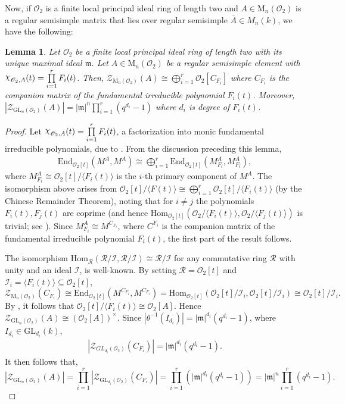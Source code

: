 \documentclass[11pt,twoside]{amsart}
\newcommand{\GL}{\mathrm{GL}}
\newcommand{\M}{\mathrm{M}}
\newcommand{\upchi}{\raisebox{0.4ex}{$\chi$}}
\newcommand{\Char}{\upchi}
\newcommand{\R}{\mathscr{O}_2}
\newcommand{\Zen}{\mathscr{Z}}
\newtheorem{lemma}{Lemma}[section]
\theoremstyle{definition} %
\begin{document}
Now, if $\R$ is a finite local principal ideal ring of length two and $A\in \M_n(\R)$ is a regular semisimple matrix that lies over regular semisimple $\overline{A} \in M_n(k)$, we have the following: 
\begin{lemma}\label{lem:centra-reg-sem-R}
Let $\R$ be a finite local principal ideal ring of length two with its unique maximal ideal $\mathfrak{m}$. Let $A\in \M_n(\R)$ be a regular semisimple element with $\Char_{\R, A}(t) =\prod\limits_{i=1}^rF_i(t)$. Then, $\Zen_{\M_n(\R)}(A)\cong \bigoplus\limits_{i=1}^r \R[C_{F_i}]$ where $C_{F_i}$ is the companion matrix of the fundamental irreducible polynomial $F_i(t)$. Moreover, $|\Zen_{\GL_n(\R)}(A)|=|\mathfrak{m}|^n\prod\limits_{i=1}^r(q^{d_i}-1)$ where $d_i$ is degree of $F_i(t)$.
\end{lemma}
\begin{proof} 
Let $\Char_{\R, A}(t) = \prod\limits_{i=1}^r F_i(t)$, a factorization into monic fundamental irreducible polynomials, due to . From the discussion preceding this lemma, 
\begin{align*}
\mathrm{End}_{\R[t]}(M^A,M^A)\cong \bigoplus\limits_{i=1}^r \mathrm{End}_{\R[t]}(M^A_{F_i},M^A_{F_i}),
\end{align*}
where $M^A_{F_i} \cong \R[t]/\langle F_i(t)\rangle$ is the $i$-th primary component of $M^A$. The isomorphism above arises from $\R[t]/\langle F(t)\rangle\cong \bigoplus\limits_{i=1}^r\R[t]/\langle F_i(t)\rangle$ (by the Chinese Remainder Theorem), noting that for $i\neq j$ the polynomials $F_i(t), F_j(t)$ are coprime (and hence $\mathrm{Hom}_{\R[t]}\left(\R/\langle F_i(t) \rangle, \R/\langle F_j(t) \rangle\right)$ is trivial; see ). Since $M^A_{F_i}\cong M^{C_{F_i}}$, where $C^{F_i}$ is the companion matrix of the fundamental irreducible polynomial $F_i(t)$, the first part of the result follows.

The isomorphism $\mathrm{Hom}_{\mathscr R}(\mathscr{R}/\mathscr{I},\mathscr R/\mathscr I)\cong \mathscr R/\mathscr I$ for any commutative ring $\mathscr R$ with unity and an ideal $\mathscr I$, is well-known. By setting $\mathscr R = \R[t]$ and $\mathscr I_i=\langle F_i(t)\rangle\subseteq \R[t]$, 
 $$\Zen_{\M_n(\R)}\left(C_{F_i}\right)\cong \mathrm{End}_{\R[t]}(M^{C_{F_i}},M^{C_{F_i}})
 =\mathrm{Hom}_{\R[t]}( \R[t]/\mathscr I_i, \R[t]/\mathscr I_i)\cong \R[t]/\mathscr I_i.$$
By , it follows that  
$\R[t]/\langle F_i(t)\rangle \cong \R[A].$
Hence $\Zen_{\GL_n(\R)}(A)\cong (\R[A])^{\times}$.
Since $|\theta^{-1}(I_{d_i}) | =|\mathfrak{m}|^{d_i}(q^{d_i}-1)$, where $I_{d_i}\in\GL_{d_i}(k)$,
\begin{align*}
|\Zen_{GL_{d_i}(\R)}(C_{F_i})|=|\mathfrak{m}|^{d_i}(q^{d_i}-1).    
\end{align*}
It then follows that,
$$ |\Zen_{\GL_n(\R)}(A)| =\prod\limits_{i=1}^r |\Zen_{\GL_{d_i}(\R)}(C_{F_i})| 
 =\prod\limits_{i=1}^r(|\mathfrak{m}|^{d_i}(q^{d_i}-1))
 =|\mathfrak{m}|^n\prod\limits_{i=1}^r(q^{d_i}-1). 
$$
\end{proof}
\end{document}
